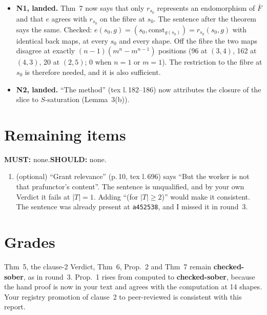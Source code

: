 \documentclass[10pt]{article}
\newcommand{\cst}{\mathrm{const}}
\begin{document}
\begin{itemize}[leftmargin=*]
  wherever there is room to fail ($n\ge2$ for $\lambda$, $m\ge2$ for $\rho$). Prop.~1 is therefore \textbf{proved for all $S,T$}, and the ``Honest scope'' paragraph
  and the Response section correctly record that nothing remains open.
\item \textbf{N1, landed.} Thm~7 now says that only $r_{s_0}$ represents an endomorphism of $\bar F$ and that $e$ agrees with $r_{s_0}$ on the fibre at $s_0$.
  The sentence after the theorem says the same. Checked: $e(s_0,g)=(s_0,\cst_{g(s_0)})=r_{s_0}(s_0,g)$ with identical back maps, at every $s_0$ and
  every shape. Off the fibre the two maps disagree at exactly $(n-1)(m^n-m^{n-1})$ positions (96 at $(3,4)$, 162 at $(4,3)$, 20 at $(2,5)$; 0 when $n=1$ or $m=1$).
  The restriction to the fibre at $s_0$ is therefore needed, and it is also sufficient.
\item \textbf{N2, landed.} ``The method'' (tex l.\,182--186) now attributes the closure of the slice to $S$-saturation (Lemma~3(b)).
\end{itemize}

\section*{Remaining items}
\textbf{MUST:} none.\quad \textbf{SHOULD:} none.
\begin{enumerate}[label=\textbf{N\arabic*.},leftmargin=*]
\item (optional) ``Grant relevance'' (p.\,10, tex l.\,696) says ``But the worker is not that prafunctor's content''. The sentence is unqualified, and by your own
  Verdict it fails at $|T|=1$. Adding ``(for $|T|\ge2$)'' would make it consistent. The sentence was already present at \texttt{a452538}, and I missed it in round~3.
\end{enumerate}

\section*{Grades}
Thm~5, the clause-2 Verdict, Thm~6, Prop.~2 and Thm~7 remain \textbf{checked-sober}, as in round~3. Prop.~1 rises from computed to \textbf{checked-sober},
because the hand proof is now in your text and agrees with the computation at 14 shapes. Your registry promotion of clause~2 to peer-reviewed is consistent
with this report.
\end{document}
